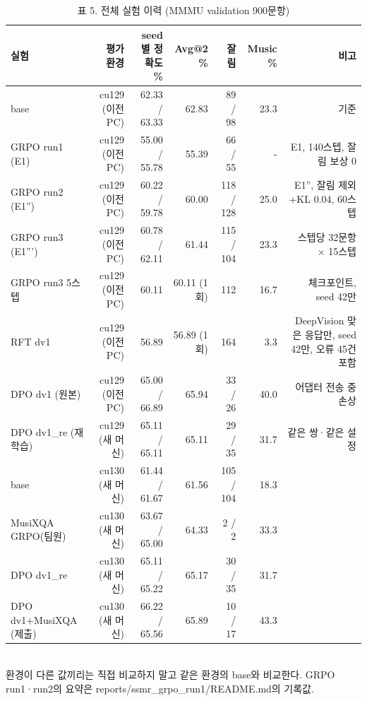\begin{table}[t]
\centering
\small
\caption{표 5. 전체 실험 이력 (MMMU validation 900문항)}
\label{tab:table5_all_experiments}
\begin{tabular}{lrrrrrr}
\toprule
실험 & 평가 환경 & seed별 정확도 \% & Avg@2 \% & 잘림 & Music \% & 비고 \\
\midrule
base & cu129 (이전 PC) & 62.33 / 63.33 & 62.83 & 89 / 98 & 23.3 & 기준 \\
GRPO run1 (E1) & cu129 (이전 PC) & 55.00 / 55.78 & 55.39 & 66 / 55 & - & E1, 140스텝, 잘림 보상 0 \\
GRPO run2 (E1'') & cu129 (이전 PC) & 60.22 / 59.78 & 60.00 & 118 / 128 & 25.0 & E1'', 잘림 제외+KL 0.04, 60스텝 \\
GRPO run3 (E1''') & cu129 (이전 PC) & 60.78 / 62.11 & 61.44 & 115 / 104 & 23.3 & 스텝당 32문항 × 15스텝 \\
GRPO run3 5스텝 & cu129 (이전 PC) & 60.11 & 60.11 (1회) & 112 & 16.7 & 체크포인트, seed 42만 \\
RFT dv1 & cu129 (이전 PC) & 56.89 & 56.89 (1회) & 164 & 3.3 & DeepVision 맞은 응답만, seed 42만, 오류 45건 포함 \\
DPO dv1 (원본) & cu129 (이전 PC) & 65.00 / 66.89 & 65.94 & 33 / 26 & 40.0 & 어댑터 전송 중 손상 \\
DPO dv1\_re (재학습) & cu129 (새 머신) & 65.11 / 65.11 & 65.11 & 29 / 35 & 31.7 & 같은 쌍·같은 설정 \\
base & cu130 (새 머신) & 61.44 / 61.67 & 61.56 & 105 / 104 & 18.3 &  \\
MusiXQA GRPO(팀원) & cu130 (새 머신) & 63.67 / 65.00 & 64.33 & 2 / 2 & 33.3 &  \\
DPO dv1\_re & cu130 (새 머신) & 65.11 / 65.22 & 65.17 & 30 / 35 & 31.7 &  \\
DPO dv1+MusiXQA (제출) & cu130 (새 머신) & 66.22 / 65.56 & 65.89 & 10 / 17 & 43.3 &  \\
\bottomrule
\end{tabular}
\\[2pt]{\footnotesize 환경이 다른 값끼리는 직접 비교하지 말고 같은 환경의 base와 비교한다. GRPO run1·run2의 요약은 reports/ssmr\_grpo\_run1/README.md의 기록값.}
\end{table}
